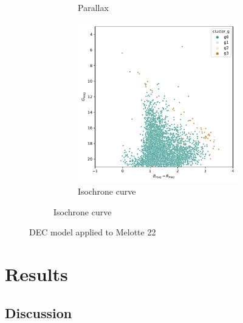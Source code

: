 \documentclass[11pt, a4paper, english]{book}
\begin{document}
\begin{figure}[htbp]
\begin{subfigure}{0.9\textwidth}
\begin{subfigure}[t]{0.3\textwidth}
      \caption{Parallax}
    \end{subfigure}
    \hfill
    \begin{subfigure}[t]{0.3\textwidth}
      \centering
      \includegraphics[width=\textwidth]{../figures/dec_isochrone_melotte_22.pdf}
      \caption{Isochrone curve}
    \end{subfigure}
  \end{subfigure}
  \caption{DEC model applied to Melotte 22}
  \label{fig:dec_melotte_22}
\end{figure}

\chapter{Results}




\section{Discussion}
\end{document}

